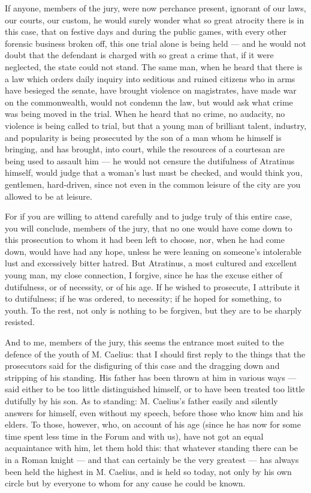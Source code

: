 
 If anyone, members of the jury, were now perchance present, ignorant of our laws, our courts, our custom, he would surely wonder what so great atrocity there is in this case, that on festive days and during the public games, with every other forensic business broken off, this one trial alone is being held --- and he would not doubt that the defendant is charged with so great a crime that, if it were neglected, the state could not stand. The same man, when he heard that there is a law which orders daily inquiry into seditious and ruined citizens who in arms have besieged the senate, have brought violence on magistrates, have made war on the commonwealth, would not condemn the law, but would ask what crime was being moved in the trial. When he heard that no crime, no audacity, no violence is being called to trial, but that a young man of brilliant talent, industry, and popularity is being prosecuted by the son of a man whom he himself is bringing, and has brought, into court, while the resources of a courtesan are being used to assault him --- he would not censure the dutifulness of Atratinus himself, would judge that a woman's lust must be checked, and would think you, gentlemen, hard-driven, since not even in the common leisure of the city are you allowed to be at leisure.

 For if you are willing to attend carefully and to judge truly of this entire case, you will conclude, members of the jury, that no one would have come down to this prosecution to whom it had been left to choose, nor, when he had come down, would have had any hope, unless he were leaning on someone's intolerable lust and excessively bitter hatred. But Atratinus, a most cultured and excellent young man, my close connection, I forgive, since he has the excuse either of dutifulness, or of necessity, or of his age. If he wished to prosecute, I attribute it to dutifulness; if he was ordered, to necessity; if he hoped for something, to youth. To the rest, not only is nothing to be forgiven, but they are to be sharply resisted.

 And to me, members of the jury, this seems the entrance most suited to the defence of the youth of M. Caelius: that I should first reply to the things that the prosecutors said for the disfiguring of this case and the dragging down and stripping of his standing. His father has been thrown at him in various ways --- said either to be too little distinguished himself, or to have been treated too little dutifully by his son. As to standing: M. Caelius's father easily and silently answers for himself, even without my speech, before those who know him and his elders. To those, however, who, on account of his age (since he has now for some time spent less time in the Forum and with us), have not got an equal acquaintance with him, let them hold this: that whatever standing there can be in a Roman knight --- and that can certainly be the very greatest --- has always been held the highest in M. Caelius, and is held so today, not only by his own circle but by everyone to whom for any cause he could be known.

